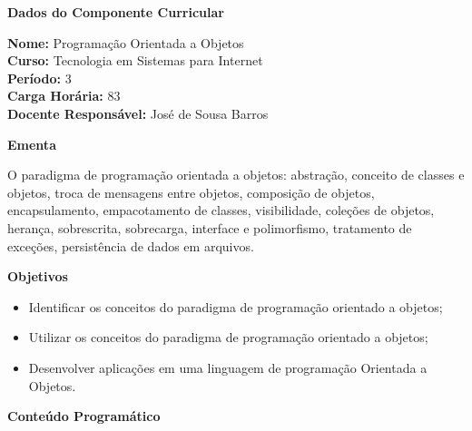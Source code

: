 

\begin{snugshade}\begin{center}\textbf{
	Dados do Componente Curricular
}\end{center}\end{snugshade}

\noindent 	\textbf{Nome:} Programação Orientada a Objetos
\\ 			\textbf{Curso:} Tecnologia em Sistemas para Internet
\\ 			\textbf{Período:} \unit{3}{\degree}
\\ 			\textbf{Carga Horária:} \unit{83}{\hour}
\\ 			\textbf{Docente Responsável:} José de Sousa Barros 



\begin{snugshade}\begin{center}\textbf{
    Ementa
\vphantom{q}}\end{center}\end{snugshade}

\noindent
O paradigma de programação orientada a objetos: abstração, conceito de classes e objetos, troca de mensagens entre objetos, composição de objetos, encapsulamento, empacotamento de classes, visibilidade, coleções de objetos, herança, sobrescrita, sobrecarga, interface e polimorfismo, tratamento de exceções, persistência de dados em arquivos.

\begin{snugshade}\begin{center}\textbf{
    Objetivos
}\end{center}\end{snugshade}

\begin{itemize}

\item Identificar os conceitos do paradigma de programação orientado a objetos;
\item Utilizar os conceitos do paradigma de programação orientado a objetos;
\item Desenvolver aplicações em uma linguagem de programação Orientada a Objetos.

\end{itemize} 


\begin{snugshade}\begin{center}\textbf{
    Conteúdo Programático
}\end{center}\end{snugshade}

